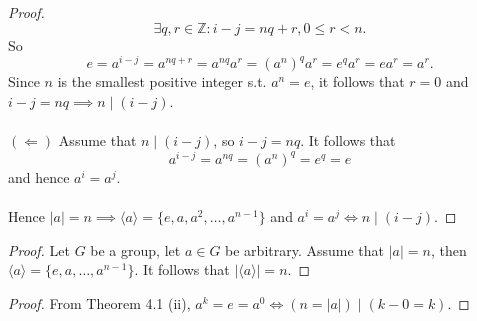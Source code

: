 \documentclass{article}
\newtheorem{corollary}{Corollary}[theorem]
\theoremstyle{definition}
\begin{document}
\begin{proof}
    \begin{equation*}
        \exists q,r \in \mathbb{Z}: i-j=nq+r, 0\leq r <n.
    \end{equation*}
    So
    \begin{equation*}
        e = a^{i-j} = a^{nq+r} = a^{nq}a^r = (a^n)^qa^r = e^qa^r = ea^r = a^r.
    \end{equation*}
    Since $n$ is the smallest positive integer s.t. $a^n=e$, it follows that $r=0$ and $i-j = nq \implies n \mid (i-j)$.
    \\ \\
    $(\Leftarrow)$ Assume that $n \mid (i-j)$, so $i-j=nq$. It follows that
    \begin{equation*}
        a^{i-j} = a^{nq} = (a^n)^q = e^q = e
    \end{equation*}
    and hence $a^i=a^j$.
    \\ \\
    Hence $|a|=n \implies \langle a \rangle = \{e,a,a^2,\dots,a^{n-1}\}$ and $a^i=a^j \iff n \mid (i-j)$.
\end{proof}

\noindent{}

\begin{proof}
   Let $G$ be a group, let $a \in G$ be arbitrary. Assume that $|a|=n$, then $\langle a \rangle = \{e,a,\dots,a^{n-1}\}$. It follows that $|\langle a \rangle| = n$.
\end{proof}

\noindent{}

\begin{proof}
    From Theorem 4.1 (ii), $a^k = e = a^0 \iff (n = |a|) \mid (k-0=k)$.
\end{proof}

\noindent{}
\\ \\
\end{document}

